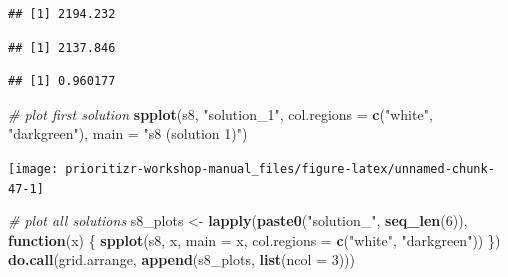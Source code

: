 \documentclass[12pt,]{book}
\newenvironment{Shaded}{\begin{snugshade}}{\end{snugshade}}
\newcommand{\KeywordTok}[1]{\textcolor[rgb]{0.13,0.29,0.53}{\textbf{#1}}}
\newcommand{\DataTypeTok}[1]{\textcolor[rgb]{0.13,0.29,0.53}{#1}}
\newcommand{\DecValTok}[1]{\textcolor[rgb]{0.00,0.00,0.81}{#1}}
\newcommand{\StringTok}[1]{\textcolor[rgb]{0.31,0.60,0.02}{#1}}
\newcommand{\CommentTok}[1]{\textcolor[rgb]{0.56,0.35,0.01}{\textit{#1}}}
\newcommand{\ControlFlowTok}[1]{\textcolor[rgb]{0.13,0.29,0.53}{\textbf{#1}}}
\newcommand{\OperatorTok}[1]{\textcolor[rgb]{0.81,0.36,0.00}{\textbf{#1}}}
\newcommand{\NormalTok}[1]{#1}
\begin{document}
\begin{verbatim}
## [1] 2194.232
\end{verbatim}

\begin{Shaded}
\end{Shaded}

\begin{verbatim}
## [1] 2137.846
\end{verbatim}

\begin{Shaded}
\end{Shaded}

\begin{verbatim}
## [1] 0.960177
\end{verbatim}

\begin{Shaded}
\begin{Highlighting}[]
\CommentTok{# plot first solution}
\KeywordTok{spplot}\NormalTok{(s8, }\StringTok{"solution_1"}\NormalTok{, }\DataTypeTok{col.regions =} \KeywordTok{c}\NormalTok{(}\StringTok{"white"}\NormalTok{, }\StringTok{"darkgreen"}\NormalTok{),}
       \DataTypeTok{main =} \StringTok{"s8 (solution 1)"}\NormalTok{)}
\end{Highlighting}
\end{Shaded}

\begin{center}\texttt{[image: prioritizr-workshop-manual\_files/figure-latex/unnamed-chunk-47-1]} \end{center}

\clearpage

\begin{Shaded}
\begin{Highlighting}[]
\CommentTok{# plot all solutions}
\NormalTok{s8_plots <-}\StringTok{ }\KeywordTok{lapply}\NormalTok{(}\KeywordTok{paste0}\NormalTok{(}\StringTok{"solution_"}\NormalTok{, }\KeywordTok{seq_len}\NormalTok{(}\DecValTok{6}\NormalTok{)), }\ControlFlowTok{function}\NormalTok{(x) \{}
  \KeywordTok{spplot}\NormalTok{(s8, x, }\DataTypeTok{main =}\NormalTok{ x, }\DataTypeTok{col.regions =} \KeywordTok{c}\NormalTok{(}\StringTok{"white"}\NormalTok{, }\StringTok{"darkgreen"}\NormalTok{))}
\NormalTok{\})}
\KeywordTok{do.call}\NormalTok{(grid.arrange, }\KeywordTok{append}\NormalTok{(s8_plots, }\KeywordTok{list}\NormalTok{(}\DataTypeTok{ncol =} \DecValTok{3}\NormalTok{)))}
\end{Highlighting}
\end{Shaded}
\end{document}
